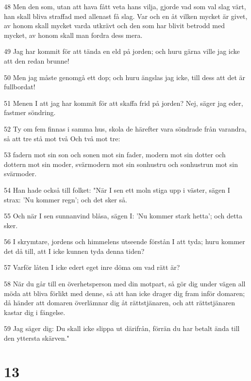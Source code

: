 \par 48 Men den som, utan att hava fått veta hans vilja, gjorde vad som val slag värt, han skall bliva straffad med allenast få slag. Var och en åt vilken mycket är givet, av honom skall mycket varda utkrävt och den som har blivit betrodd med mycket, av honom skall man fordra dess mera.
\par 49 Jag har kommit för att tända en eld på jorden; och huru gärna ville jag icke att den redan brunne!
\par 50 Men jag måste genomgå ett dop; och huru ängslas jag icke, till dess att det är fullbordat!
\par 51 Menen I att jag har kommit för att skaffa frid på jorden? Nej, säger jag eder, fastmer söndring.
\par 52 Ty om fem finnas i samma hus, skola de härefter vara söndrade från varandra, så att tre stå mot två Och två mot tre:
\par 53 fadern mot sin son och sonen mot sin fader, modern mot sin dotter och dottern mot sin moder, svärmodern mot sin sonhustru och sonhustrun mot sin svärmoder.
\par 54 Han hade också till folket: "När I sen ett moln stiga upp i väster, sägen I strax: 'Nu kommer regn'; och det sker så.
\par 55 Och när I sen sunnanvind blåsa, sägen I: 'Nu kommer stark hetta'; och detta sker.
\par 56 I skrymtare, jordens och himmelens utseende förstån I att tyda; huru kommer det då till, att I icke kunnen tyda denna tiden?
\par 57 Varför låten I icke edert eget inre döma om vad rätt är?
\par 58 När du går till en överhetsperson med din motpart, så gör dig under vägen all möda att bliva förlikt med denne, så att han icke drager dig fram inför domaren; då händer att domaren överlämnar dig åt rättstjänaren, och att rättstjänaren kastar dig i fängelse.
\par 59 Jag säger dig: Du skall icke slippa ut därifrån, förrän du har betalt ända till den yttersta skärven."

\chapter{13}

